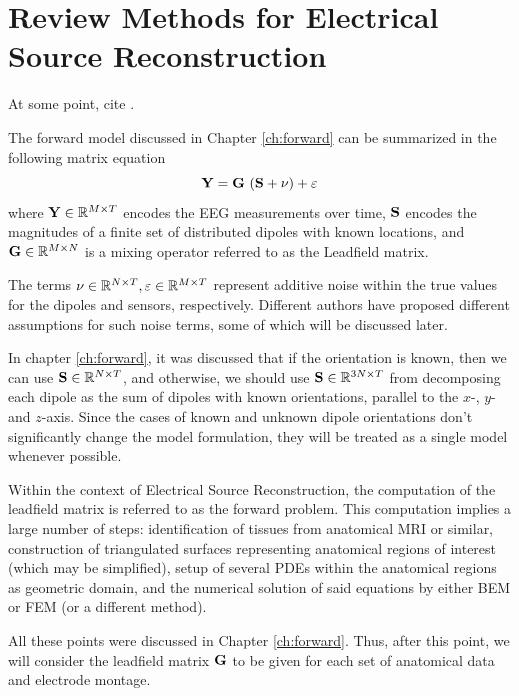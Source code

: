 \chapter{Review Methods for Electrical Source Reconstruction}
\label{ch:review}


At some point, cite \cite{grech2008review}.

The forward model discussed in Chapter \ref{ch:forward} can be summarized in the following matrix equation
\begin{equation*}
\mathbf{Y} = \mathbf{G}\, \left(  \mathbf{S} + \nu  \right) + \varepsilon
\label{eq:general}
\end{equation*}
where $\mathbf{Y} \in \mathbb{R}^{M\times T}$ encodes the EEG measurements over time, $\mathbf{S}$ encodes the magnitudes of a finite set of distributed dipoles with known locations, and $\mathbf{G} \in \mathbb{R}^{M\times N}$ is a mixing operator referred to as the Leadfield matrix.

The terms $\nu \in \mathbb{R}^{N\times T}, \varepsilon\in\mathbb{R}^{M\times T}$ represent additive noise within the true values for the dipoles and sensors, respectively. 
%
Different authors have proposed different assumptions for such noise terms, some of which will be discussed later.

In chapter \ref{ch:forward}, it was discussed that if the orientation is known, then we can use $\mathbf{S}\in \mathbb{R}^{N\times T}$, and otherwise, we should use $\mathbf{S}\in \mathbb{R}^{3N\times T}$ from decomposing each dipole as the sum of dipoles with known orientations, parallel to the $x$-, $y$- and $z$-axis.
%
Since the cases of known and unknown dipole orientations don't significantly change the model formulation, they will be treated as a single model whenever possible.

Within the context of Electrical Source Reconstruction, the computation of the leadfield matrix is referred to as the forward problem.
%
This computation implies a large number of steps: identification of tissues from anatomical MRI or similar, construction of triangulated surfaces representing anatomical regions of interest (which may be simplified), setup of several PDEs within the anatomical regions as geometric domain, and the numerical solution of said equations by either BEM or FEM (or a different method).

All these points were discussed in Chapter \ref{ch:forward}. 
%
Thus, after this point, we will consider the leadfield matrix $\mathbf{G}$ to be given for each set of anatomical data and electrode montage.

